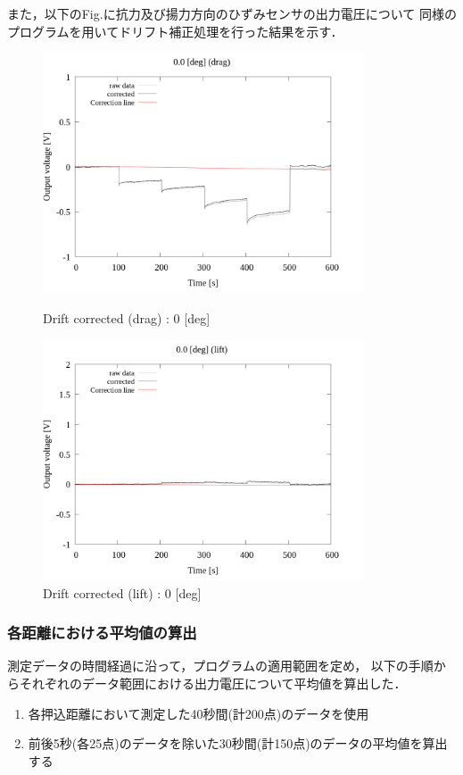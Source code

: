 また，以下のFig.に抗力及び揚力方向のひずみセンサの出力電圧について
同様のプログラムを用いてドリフト補正処理を行った結果を示す．

\begin{figure}[htbp]
	\footnotesize
	\begin{center}
		\includegraphics[width=95mm]{../../02_workspace/result/2-1/plot/02-2_drag/02_drag-drift_0.png}
		\caption{Drift corrected (drag) : 0 [deg]}
		\includegraphics[width=95mm]{../../02_workspace/result/2-1/plot/02-3_lift/02_lift-drift_0.png}
		\caption{Drift corrected (lift) : 0 [deg]}
	\end{center}
\end{figure}

\newpage

\subsubsection{各距離における平均値の算出}

測定データの時間経過に沿って，プログラムの適用範囲を定め，
以下の手順からそれぞれのデータ範囲における出力電圧について平均値を算出した．

\begin{enumerate}[(1)]
	\item 各押込距離において測定した40秒間(計200点)のデータを使用
	\item 前後5秒(各25点)のデータを除いた30秒間(計150点)のデータの平均値を算出する
\end{enumerate}

